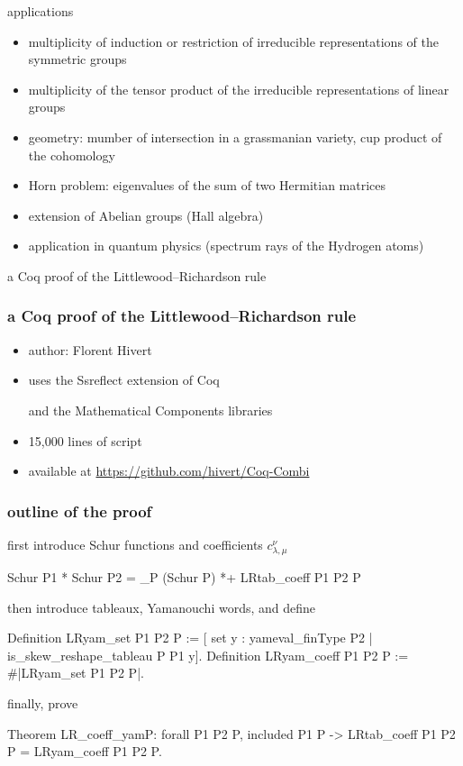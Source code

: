 \documentclass{beamer}
\let\emph\alert
\begin{document}

\begin{frame}{applications}
  \begin{itemize}
  \item multiplicity of induction or restriction of irreducible representations
    of the symmetric groups
  \item multiplicity of the tensor product of the irreducible representations
    of linear groups
  \item geometry: mumber of intersection in a grassmanian variety, cup product
    of the cohomology
  \item Horn problem: eigenvalues of the sum of two Hermitian matrices
  \item extension of Abelian groups (Hall algebra)
  \item application in quantum physics (spectrum rays of the Hydrogen atoms)
  \end{itemize}
\end{frame}

\begin{frame}
  \begin{center}
    \emph{a Coq proof of the Littlewood–Richardson rule} \\
    \hrulefill
  \end{center}
\end{frame}

\begin{frame}\frametitle{a Coq proof of the Littlewood–Richardson rule}
  \begin{itemize}
  \item author: Florent Hivert
  \item uses the Ssreflect extension of Coq \par
    and the Mathematical Components libraries
  \item 15,000 lines of script
  \item available at \url{https://github.com/hivert/Coq-Combi}
  \end{itemize}
\end{frame}

\begin{frame}[fragile]\frametitle{outline of the proof}
  first introduce Schur functions and coefficients $c_{\lambda, \mu}^{\nu}$
\begin{coq}
Schur P1 * Schur P2 =
  \sum_P (Schur P) *+ LRtab_coeff P1 P2 P
\end{coq}
  then introduce tableaux, Yamanouchi words, and define
\begin{coq}
Definition LRyam_set P1 P2 P :=
  [ set y : yameval_finType P2 |
    is_skew_reshape_tableau P P1 y].
Definition LRyam_coeff P1 P2 P :=
  #|LRyam_set P1 P2 P|.
\end{coq}
  finally, prove
\begin{coq}
Theorem LR_coeff_yamP:
  forall P1 P2 P, included P1 P ->
  LRtab_coeff P1 P2 P = LRyam_coeff P1 P2 P.
\end{coq}
\end{frame}
\end{document}
